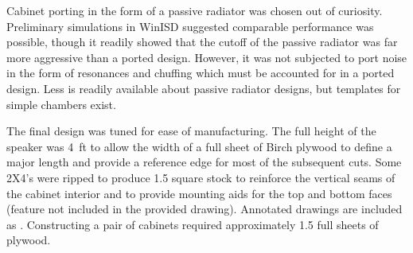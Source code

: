 %
Cabinet porting in the form of a passive radiator was chosen out of curiosity. Preliminary simulations in WinISD suggested comparable performance was possible, though it readily showed that the cutoff of the passive radiator was far more aggressive than a ported design. However, it was not subjected to port noise in the form of resonances and chuffing which must be accounted for in a ported design. Less is readily available about passive radiator designs, but templates for simple chambers exist.\par
%
The final design was tuned for ease of manufacturing. The full height of the speaker was \SI{4}{ft} to allow the width of a full sheet of Birch plywood to define a major length and provide a reference edge for most of the subsequent cuts. Some 2X4’s were ripped to produce \SI{1.5}{\in} square stock to reinforce the vertical seams of the cabinet interior and to provide mounting aids for the top and bottom faces (feature not included in the provided drawing). Annotated drawings are included as . Constructing a pair of cabinets required approximately 1.5 full sheets of plywood.\par
%
